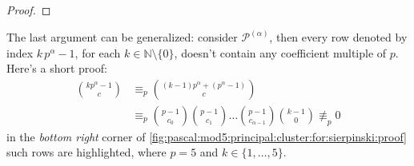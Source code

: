 \begin{proof}

\end{proof}


The 
last argument can be generalized: consider $\mathcal{P}^{(\alpha)}$, then every row denoted by index 
$k\,p^{\alpha} -1$, for each $k\in\mathbb{N}\setminus\lbrace0\rbrace$, doesn't contain any 
coefficient multiple of $p$. Here's a short proof:
\begin{displaymath}
    \begin{split}
      {{kp^{\alpha}-1} \choose {c}} &\equiv_{p}{{(k-1)p^{\alpha}+ (p^{\alpha}-1)} \choose {c}}\\ 
        &\equiv_{p} {{p-1} \choose {c_0}} {{p-1} \choose {c_1}} \ldots 
      {{p-1} \choose {c_{{\alpha}-1}}}{{k-1} \choose {0}} \not\equiv_{p} 0
    \end{split}
\end{displaymath}
in the \emph{bottom right} corner of \autoref{fig:pascal:mod5:principal:cluster:for:sierpinski:proof}
such rows are highlighted, where $p=5$ and $k\in\lbrace1,\ldots,5\rbrace$.

